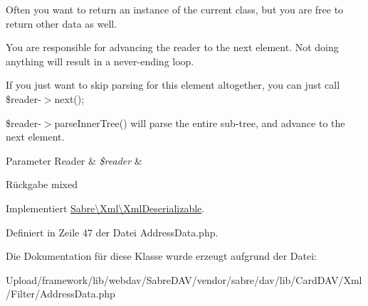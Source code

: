 Often you want to return an instance of the current class, but you are free to return other data as well.

You are responsible for advancing the reader to the next element. Not doing anything will result in a never-\/ending loop.

If you just want to skip parsing for this element altogether, you can just call \$reader-\/$>$next();

\$reader-\/$>$parse\+Inner\+Tree() will parse the entire sub-\/tree, and advance to the next element.


\begin{DoxyParams}[1]{Parameter}
Reader & {\em \$reader} & \\
\hline
\end{DoxyParams}
\begin{DoxyReturn}{Rückgabe}
mixed 
\end{DoxyReturn}


Implementiert \mbox{\hyperlink{interface_sabre_1_1_xml_1_1_xml_deserializable_a19e0eca545b9a0d93f7d6b69085ade30}{Sabre\textbackslash{}\+Xml\textbackslash{}\+Xml\+Deserializable}}.



Definiert in Zeile 47 der Datei Address\+Data.\+php.



Die Dokumentation für diese Klasse wurde erzeugt aufgrund der Datei\+:\begin{DoxyCompactItemize}
\item 
Upload/framework/lib/webdav/\+Sabre\+D\+A\+V/vendor/sabre/dav/lib/\+Card\+D\+A\+V/\+Xml/\+Filter/Address\+Data.\+php\end{DoxyCompactItemize}
